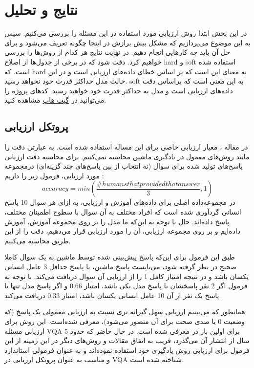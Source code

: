 \section{ نتایج و تحلیل}
{  در این بخش ابتدا روش ارزیابی مورد استفاده در این مسئله را بررسی می‌کنیم. سپس به این موضوع می‌پردازیم که مشکل بیش برازش در اینجا چگونه تعریف می‌شود و برای حل آن باید چه کارهایی انجام دهیم. در نهایت نتایج هر کدام از روش‌ها را بررسی خواهیم کرد. دقت شود که در برخی از جدول‌ها از اصلاح hard‌ و soft استفاده شده است. که hard به معنای این است که 
	  بر اساس خطای داده‌های ارزیابی است و در این حالت مدل حداکثر قدرت خود نخواهد رسید. soft به این معنی است که 
	  براساس دقت داده‌های ارزیابی است و مدل به حداکثر قدرت خود خواهید رسید. کدهای پروژه را می‌توانید در
	  \href{https://github.com/maryamhashemi/Persian_VQA}{ گیت هاب}
	  مشاهده کنید.
	\subsection{پروتکل ارزیابی}
	{
		در مقاله
		\cite{antol2015vqa}
		، معیار ارزیابی خاصی برای این مساله استفاده شده است. به عبارتی دقت را مانند روش‌های معمول در یادگیری ماشین محاسبه نمی‌کنیم. برای محاسبه دقت ارزیابی پاسخ‌های تولید شده برای سوال (نه انتخاب از بین پاسخ‌های چند گزینه‌ای)   درمجموعه مورد ارزیابی، فرمول زیر را داریم :
		\begin{equation}
		accuracy = min(\frac{\# humans that provided that answer}{3} , 1)
		\label{eq:2}
		\end{equation}
		در مجموعه‌داده اصلی برای داده‌های آموزش و ارزیابی، به ازای هر سوال 10 پاسخ انسانی گردآوری شده است که افراد مختلف به آن سوال با سطوح اطمینان مختلف، پاسخ داده‌اند. حال با توجه به این‌که ما مدل را بر روی مجموعه آموزش، آموزش داده‌ایم و بر روی مجموعه ارزیابی، آن را مورد ارزیابی قرار می‌دهیم، دقت را از این طریق محاسبه می‌کنیم.
		
		طبق این فرمول برای این‌که پاسخ پیش‌بینی شده توسط ماشین به یک سوال کاملا صحیح در نظر گرفته شود، می‌بایست پاسخ ماشین، با پاسخ حداقل 3 عامل انسانی یکسان باشد و در نتیجه امتیاز کامل 1 را از ارزیابی آن سوال دریافت می‌کند. با توجه به فرمول اگر 2 نفر پاسخشان با پاسخ مدل یکی باشد، امتیاز 0.66 و اگر پاسخ مدل تنها با پاسخ یک نفر از آن 10 عامل انسانی یکسان باشد، امتیاز 0.33 دریافت می‌کند.
		
		همانطور که می‌بینیم ارزیابی سهل گیرانه تری نسبت به ارزیابی معمولی یک پاسخ (که وضعیت 0 یا صدی صحت برای آن متصور می‌شود)، معرفی شده‌است.  این روش برای ارزیابی مسئله VQA برای اولین بار در 
		\cite{antol2015vqa}
		معرفی شده است. در حال حاضر که حدود 5 سال از انتشار آن می‌گذرد، قریب به اتفاق مقالات و روش‌های دیگر در این زمینه از این فرمول برای ارزیابی روش یادگیری خود استفاده نموده‌اند و به عنوان فرمولی استاندارد و مناسب به عنوان پروتکل ارزیابی در VQA شناخته شده است.
		
}}
